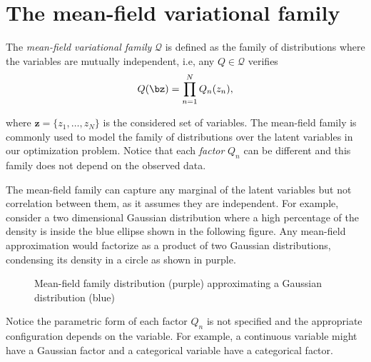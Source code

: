 
\section{The mean-field variational family}

The \emph{mean-field variational family} \(\mathcal{Q}\) is defined as the family of distributions where the variables are mutually independent, i.e, any \(Q \in \mathcal{Q}\) verifies
\[
  Q(\bz) = \prod_{n=1}^{N}Q_{n}(z_{n}),
\]

where \(\bm{z} = \{z_{1},\dots,z_{N}\}\) is the considered set of variables. The mean-field family is commonly used to model the family of distributions over the latent variables in our optimization problem. Notice that each \emph{factor} \(Q_{n}\) can be different and this family does not depend on the observed data.

The mean-field family can capture any marginal of the latent variables but not correlation between them, as it assumes they are independent. For example, consider a two dimensional Gaussian distribution where a high percentage of the density is inside the blue ellipse shown in the following figure. Any mean-field approximation would factorize as a product of two Gaussian distributions, condensing its density in a circle as shown in purple.

\begin{figure}[h!]
\centering
{}
  \caption{Mean-field family distribution (purple) approximating a Gaussian distribution (blue)}
\end{figure}

Notice the parametric form of each factor \(Q_{n}\) is not specified and the appropriate configuration depends on the variable. For example, a continuous variable might have a Gaussian factor and a categorical variable have a categorical factor.

